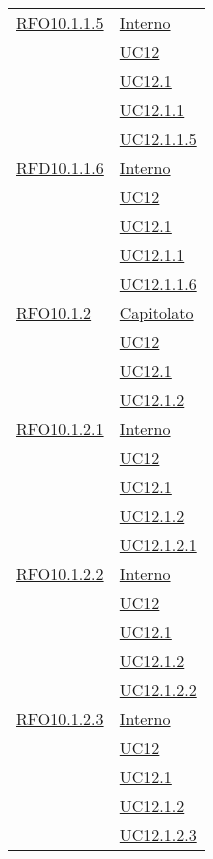 \begin{longtable}{|>{\centering}m{5cm}|m{5cm}<{\centering}|}
 \hyperlink{RFO10.1.1.5}{RFO10.1.1.5} 
 & \hyperlink{Interno}{Interno}\\
& \hyperref[UC12]{UC12}\\
& \hyperref[UC12.1]{UC12.1}\\
& \hyperref[UC12.1.1]{UC12.1.1}\\
& \hyperref[UC12.1.1.5]{UC12.1.1.5}\\\hline

 \hyperlink{RFD10.1.1.6}{RFD10.1.1.6} 
 & \hyperlink{Interno}{Interno}\\
& \hyperref[UC12]{UC12}\\
& \hyperref[UC12.1]{UC12.1}\\
& \hyperref[UC12.1.1]{UC12.1.1}\\
& \hyperref[UC12.1.1.6]{UC12.1.1.6}\\\hline

 \hyperlink{RFO10.1.2}{RFO10.1.2} 
  & \hyperlink{Capitolato}{Capitolato}\\
& \hyperref[UC12]{UC12}\\
& \hyperref[UC12.1]{UC12.1}\\
& \hyperref[UC12.1.2]{UC12.1.2}\\\hline

 \hyperlink{RFO10.1.2.1}{RFO10.1.2.1} 
 & \hyperlink{Interno}{Interno}\\
& \hyperref[UC12]{UC12}\\
& \hyperref[UC12.1]{UC12.1}\\
& \hyperref[UC12.1.2]{UC12.1.2}\\
& \hyperref[UC12.1.2.1]{UC12.1.2.1}\\\hline

 \hyperlink{RFO10.1.2.2}{RFO10.1.2.2} 
 & \hyperlink{Interno}{Interno}\\
& \hyperref[UC12]{UC12}\\
& \hyperref[UC12.1]{UC12.1}\\
& \hyperref[UC12.1.2]{UC12.1.2}\\
& \hyperref[UC12.1.2.2]{UC12.1.2.2}\\\hline

 \hyperlink{RFO10.1.2.3}{RFO10.1.2.3} & \hyperlink{Interno}{Interno}\\
& \hyperref[UC12]{UC12}\\
& \hyperref[UC12.1]{UC12.1}\\
& \hyperref[UC12.1.2]{UC12.1.2}\\
& \hyperref[UC12.1.2.3]{UC12.1.2.3}\\\hline


\end{longtable}

